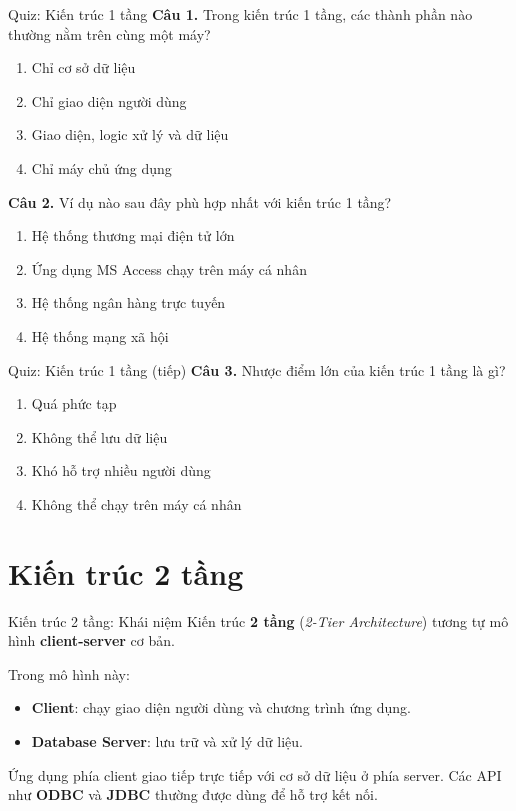 \documentclass[aspectratio=169,11pt]{beamer}
\newcommand{\keyword}[1]{\textcolor{accent}{\textbf{#1}}}
\newcommand{\tightlist}{\setlength{\itemsep}{2pt}\setlength{\parskip}{0pt}}
\newcommand{\qoption}[2]{\item[#1.] #2}
\begin{document}
\begin{frame}{Quiz: Kiến trúc 1 tầng}
\small
\textbf{Câu 1.} Trong kiến trúc 1 tầng, các thành phần nào thường nằm trên cùng một máy?
\begin{enumerate}
\tightlist
  \qoption{A}{Chỉ cơ sở dữ liệu}
  \qoption{B}{Chỉ giao diện người dùng}
  \qoption{C}{Giao diện, logic xử lý và dữ liệu}
  \qoption{D}{Chỉ máy chủ ứng dụng}
\end{enumerate}

\textbf{Câu 2.} Ví dụ nào sau đây phù hợp nhất với kiến trúc 1 tầng?
\begin{enumerate}
\tightlist
  \qoption{A}{Hệ thống thương mại điện tử lớn}
  \qoption{B}{Ứng dụng MS Access chạy trên máy cá nhân}
  \qoption{C}{Hệ thống ngân hàng trực tuyến}
  \qoption{D}{Hệ thống mạng xã hội}
\end{enumerate}
\end{frame}

\begin{frame}{Quiz: Kiến trúc 1 tầng (tiếp)}
\small
\textbf{Câu 3.} Nhược điểm lớn của kiến trúc 1 tầng là gì?
\begin{enumerate}
\tightlist
  \qoption{A}{Quá phức tạp}
  \qoption{B}{Không thể lưu dữ liệu}
  \qoption{C}{Khó hỗ trợ nhiều người dùng}
  \qoption{D}{Không thể chạy trên máy cá nhân}
\end{enumerate}
\end{frame}

\section{Kiến trúc 2 tầng}

\begin{frame}{Kiến trúc 2 tầng: Khái niệm}
\small
Kiến trúc \keyword{2 tầng} (\textit{2-Tier Architecture}) tương tự mô hình \keyword{client-server} cơ bản.

\vspace{0.2cm}
Trong mô hình này:
\begin{itemize}
\tightlist
  \item \keyword{Client}: chạy giao diện người dùng và chương trình ứng dụng.
  \item \keyword{Database Server}: lưu trữ và xử lý dữ liệu.
\end{itemize}

Ứng dụng phía client giao tiếp trực tiếp với cơ sở dữ liệu ở phía server. Các API như \keyword{ODBC} và \keyword{JDBC} thường được dùng để hỗ trợ kết nối.
\end{frame}
\end{document}
